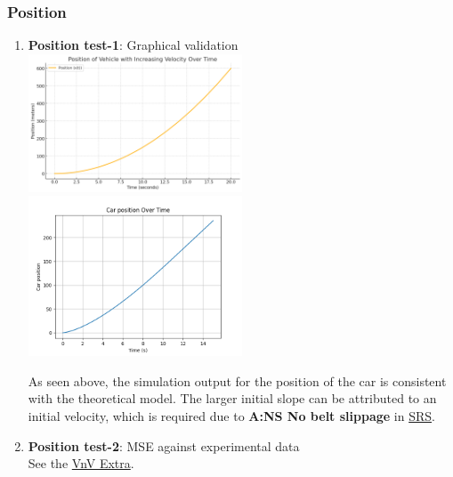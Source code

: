 \documentclass[12pt, titlepage]{article}
\begin{document}
\subsubsection{Position}
\begin{enumerate}
\item{\textbf{Position test-1}: Graphical validation}\\

\includegraphics[width=0.5\textwidth]{theoretical-figures/position.png}
\includegraphics[width=0.5\textwidth]{simulation-figures/car_position.png}

As seen above, the simulation output for the position of the car is consistent with the theoretical model. The larger initial slope can be attributed to an initial velocity, which is required due to \textbf{A:NS No belt slippage} in \href{https://github.com/gr812b/CVT-Simulator/blob/develop/docs/SRS/SRS.pdf}{SRS}.

\item{\textbf{Position test-2}: MSE against experimental data}\\
See the \href{https://github.com/gr812b/CVT-Simulator/blob/develop/docs/VnVExtra/VnVExtra.pdf}{VnV Extra}.

\end{enumerate}
\end{document}
